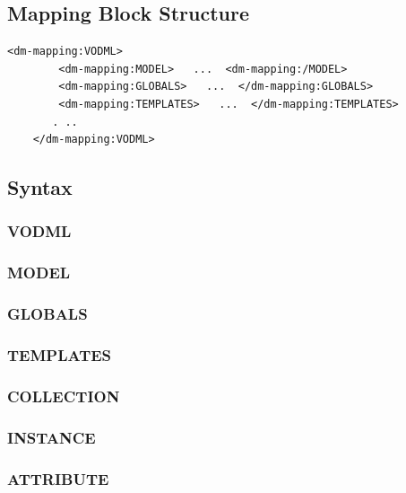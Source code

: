 \documentclass[11pt,a4paper]{ivoa}
\begin{document}
\subsection{Mapping Block Structure}

\begin{lstlisting}[caption={Complete mapping block example},style=XML,basicstyle=\small]
   <dm-mapping:VODML>
        <dm-mapping:MODEL>   ...  <dm-mapping:/MODEL>
        <dm-mapping:GLOBALS>   ...  </dm-mapping:GLOBALS>
        <dm-mapping:TEMPLATES>   ...  </dm-mapping:TEMPLATES>
       . ..
    </dm-mapping:VODML>
\end{lstlisting}


\subsection{Syntax}

\subsubsection{VODML}

\FloatBarrier
 
\subsubsection{MODEL}

\FloatBarrier

\subsubsection{GLOBALS}

\FloatBarrier

\subsubsection{TEMPLATES}

\FloatBarrier

\subsubsection{COLLECTION}

\FloatBarrier

\subsubsection{INSTANCE}

\FloatBarrier

\subsubsection{ATTRIBUTE}

\FloatBarrier
\end{document}
